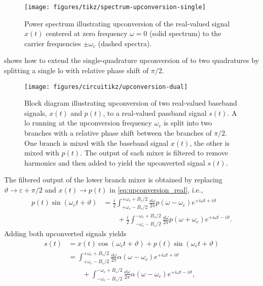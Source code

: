 \begin{figure}[htb]
	\centering
	\texttt{[image: figures/tikz/spectrum-upconversion-single]}
	\caption{Power spectrum illustrating upconversion of the real-valued signal $x(t)$ centered at zero frequency $\omega=0$ (solid spectrum) to the carrier frequencies $\pm\omega_c$ (dashed spectra).}\label{fig:spectrum_upconversion_single}
\end{figure}
 shows how to extend the single-quadrature upconversion of  to two quadratures by splitting a single \gls{lo} with relative phase shift of $\pi/2$.
\begin{figure}[htb]
	\centering
	\texttt{[image: figures/circuitikz/upconversion-dual]}
	\caption{Block diagram illustrating upconversion of two real-valued baseband signals, $x(t)$ and $p(t)$, to a real-valued passband signal $s(t)$. A \gls{lo} running at the upconversion frequency $\omega_c$ is split into two branches with a relative phase shift between the branches of $\pi/2$. One branch is mixed with the baseband signal $x(t)$, the other is mixed with $p(t)$. The output of each mixer is filtered to remove harmonics and then added to yield the upconverted signal $s(t)$.}\label{fig:upconversion_dual}
\end{figure}
The filtered output of the lower branch mixer is obtained by replacing $\vartheta\to\varepsilon+\pi/2$ and $x(t)\to p(t)$ in \cref{eq:upconversion_real}, i.e.,
\begin{equation}
	\begin{split}
		p(t)
		\sin(\omega_ct+\vartheta)
		&=
		\frac{i}{2}
		\int_{+\omega_c-B_s/2}^{+\omega_c+B_s/2}
		\frac{\dd{\omega}}{2\pi}
		p(\omega-\omega_c)
		e^{+i\omega t+i\vartheta}
		\\
		&\qquad+
		\frac{i}{2}
		\int_{-\omega_c-B_s/2}^{-\omega_c+B_s/2}
		\frac{\dd{\omega}}{2\pi}
		p(\omega+\omega_c)
		e^{+i\omega t-i\vartheta}
		.
	\end{split}
	\label{eq:upconversion_real}
\end{equation}
Adding both upconverted signals yields
\begin{equation}
	\begin{split}
		s(t)
		&=
		x(t)
		\cos(\omega_ct+\vartheta)
		+
		p(t)
		\sin(\omega_ct+\vartheta)
		\\
		&=
		\int_{+\omega_c-B_s/2}^{+\omega_c+B_s/2}
		\frac{\dd{\omega}}{2\pi}
		\alpha(\omega-\omega_c)
		e^{+i\omega t+i\vartheta}
		\\
		&\qquad+
		\int_{-\omega_c-B_s/2}^{-\omega_c+B_s/2}
		\frac{\dd{\omega}}{2\pi}
		\alpha(\omega-\omega_c)
		e^{+i\omega t-i\vartheta}
		,
	\end{split}
	\label{eq:upconversion_dual}
\end{equation}
